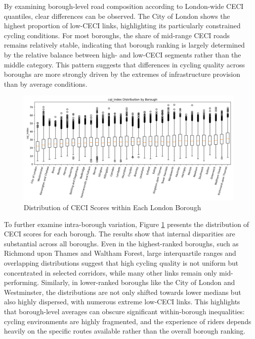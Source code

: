 \documentclass[
  12pt,
  oneside]{book}
\begin{document}
By examining borough-level road composition according to London-wide CECI quantiles, clear differences can be observed. The City of London shows the highest proportion of low-CECI links, highlighting its particularly constrained cycling conditions. For most boroughs, the share of mid-range CECI roads remains relatively stable, indicating that borough ranking is largely determined by the relative balance between high- and low-CECI segments rather than the middle category. This pattern suggests that differences in cycling quality across boroughs are more strongly driven by the extremes of infrastructure provision than by average conditions.

\begin{figure}

{\centering \includegraphics[width=1\linewidth]{general_images/box_cqi_by_borough} 

}

\caption{Distribution of CECI Scores within Each London Borough}\label{fig:boxcqiborough}
\end{figure}

To further examine intra-borough variation, Figure \ref{fig:boxcqiborough} presents the distribution of CECI scores for each borough. The results show that internal disparities are substantial across all boroughs. Even in the highest-ranked boroughs, such as Richmond upon Thames and Waltham Forest, large interquartile ranges and overlapping distributions suggest that high cycling quality is not uniform but concentrated in selected corridors, while many other links remain only mid-performing. Similarly, in lower-ranked boroughs like the City of London and Westminster, the distributions are not only shifted towards lower medians but also highly dispersed, with numerous extreme low-CECI links. This highlights that borough-level averages can obscure significant within-borough inequalities: cycling environments are highly fragmented, and the experience of riders depends heavily on the specific routes available rather than the overall borough ranking.
\end{document}
